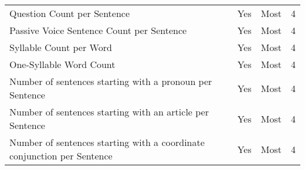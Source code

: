 \begin{table}[htbp]
\begin{tabular}{m{} c c c}
        Question Count per Sentence & Yes & Most & 4 \\
        Passive Voice Sentence Count per Sentence & Yes & Most & 4 \\
        Syllable Count per Word & Yes & Most & 4 \\
        One-Syllable Word Count & Yes & Most & 4 \\
        Number of sentences starting with a pronoun per Sentence & Yes & Most & 4 \\
        Number of sentences starting with an article per Sentence & Yes & Most & 4 \\
        Number of sentences starting with a coordinate conjunction per Sentence & Yes & Most & 4 \\
        \bottomrule
    \end{tabular}
\end{table}